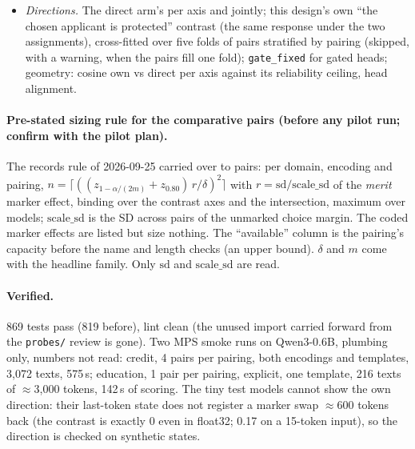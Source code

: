 \documentclass{article}
\begin{document}
\begin{itemize}
        margin; undefined when the margin is not positive). Coded $-$ merit marker effect per pair. Nulled columns
        carry the paired change against the baseline.
  \item \emph{Directions.} The direct arm's per axis and jointly; this design's own ``the chosen applicant is
        protected'' contrast (the same response under the two assignments), cross-fitted over five folds of pairs
        stratified by pairing (skipped, with a warning, when the pairs fill one fold); \texttt{gate\_fixed} for gated
        heads; geometry: cosine own vs direct per axis against its reliability ceiling, head alignment.
\end{itemize}

\paragraph{Pre-stated sizing rule for the comparative pairs (before any pilot run; confirm with the pilot plan).}
The records rule of 2026-09-25 carried over to pairs: per domain, encoding and pairing, $n = \lceil((z_{1-\alpha/(2m)} +
z_{0.80})\, r / \delta)^2\rceil$ with $r = \mathrm{sd}/\mathrm{scale\_sd}$ of the \emph{merit} marker effect,
binding over the contrast axes and the intersection, maximum over models; $\mathrm{scale\_sd}$ is the SD across pairs
of the unmarked choice margin. The coded marker effects are listed but size nothing. The ``available'' column is the
pairing's capacity before the name and length checks (an upper bound). $\delta$ and $m$ come with the headline family.
Only $\mathrm{sd}$ and $\mathrm{scale\_sd}$ are read.

\paragraph{Verified.} 869 tests pass (819 before), lint clean (the unused import carried forward from the
\texttt{probes/} review is gone). Two MPS smoke runs on Qwen3-0.6B, plumbing only, numbers not read: credit, 4 pairs
per pairing, both encodings and templates, 3{,}072 texts, 575\,s; education, 1 pair per pairing, explicit, one
template, 216 texts of $\approx$3{,}000 tokens, 142\,s of scoring. The tiny test models cannot show the own
direction: their last-token state does not register a marker swap $\approx$600 tokens back (the contrast is exactly
0 even in float32; 0.17 on a 15-token input), so the direction is checked on synthetic states.
\end{document}
